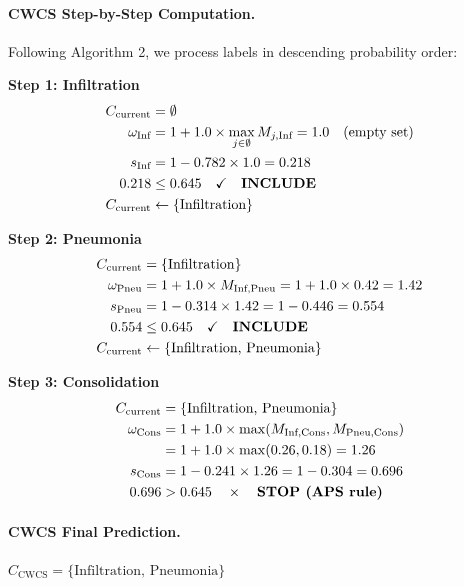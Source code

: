 \paragraph{CWCS Step-by-Step Computation.} Following Algorithm 2, we process labels in descending probability order:

\textbf{Step 1: Infiltration}
\begin{align*}
C_{\text{current}} &= \emptyset \\
\omega_{\text{Inf}} &= 1 + 1.0 \times \max_{j \in \emptyset} M_{j,\text{Inf}} = 1.0 \quad \text{(empty set)} \\
s_{\text{Inf}} &= 1 - 0.782 \times 1.0 = 0.218 \\
0.218 &\leq 0.645 \quad \checkmark \quad \text{\textbf{INCLUDE}} \\
C_{\text{current}} &\leftarrow \{\text{Infiltration}\}
\end{align*}

\textbf{Step 2: Pneumonia}
\begin{align*}
C_{\text{current}} &= \{\text{Infiltration}\} \\
\omega_{\text{Pneu}} &= 1 + 1.0 \times M_{\text{Inf,Pneu}} = 1 + 1.0 \times 0.42 = 1.42 \\
s_{\text{Pneu}} &= 1 - 0.314 \times 1.42 = 1 - 0.446 = 0.554 \\
0.554 &\leq 0.645 \quad \checkmark \quad \text{\textbf{INCLUDE}} \\
C_{\text{current}} &\leftarrow \{\text{Infiltration, Pneumonia}\}
\end{align*}

\textbf{Step 3: Consolidation}
\begin{align*}
C_{\text{current}} &= \{\text{Infiltration, Pneumonia}\} \\
\omega_{\text{Cons}} &= 1 + 1.0 \times \max(M_{\text{Inf,Cons}}, M_{\text{Pneu,Cons}}) \\
&= 1 + 1.0 \times \max(0.26, 0.18) = 1.26 \\
s_{\text{Cons}} &= 1 - 0.241 \times 1.26 = 1 - 0.304 = 0.696 \\
0.696 &> 0.645 \quad \times \quad \text{\textbf{STOP (APS rule)}}
\end{align*}

\paragraph{CWCS Final Prediction.} $C_{\text{CWCS}} = \{\text{Infiltration, Pneumonia}\}$

